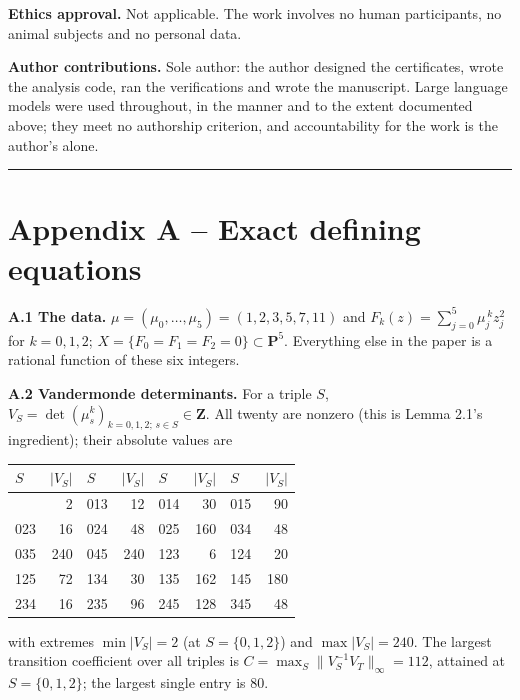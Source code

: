 \textbf{Ethics approval.} Not applicable. The work involves no human participants, no animal subjects and no personal data.

\textbf{Author contributions.} Sole author: the author designed the certificates, wrote the analysis code, ran the verifications and wrote the manuscript. Large language models were used throughout, in the manner and to the extent documented above; they meet no authorship criterion, and accountability for the work is the author's alone.

\begin{center}\rule{\linewidth}{0.5pt}\end{center}



\section{Appendix A -- Exact defining equations}\label{appendix-a-exact-defining-equations}

\textbf{A.1 The data.} \(\mu = (\mu_0, \dots, \mu_5) = (1, 2, 3, 5, 7, 11)\) and \(F_k(z) = \sum_{j=0}^{5} \mu_j^{\,k} z_j^2\) for \(k = 0, 1, 2\); \(X = \{F_0 = F_1 = F_2 = 0\} \subset \mathbf{P}^5\). Everything else in the paper is a rational function of these six integers.

\textbf{A.2 Vandermonde determinants.} For a triple \(S\), \(V_S = \det(\mu_s^k)_{k=0,1,2;\, s \in S} \in \mathbf{Z}\). All twenty are nonzero (this is Lemma 2.1's ingredient); their absolute values are

\begin{longtable}[]{@{}lrlrlrlr@{}}
\toprule\noalign{}
\(S\) & \(|V_S|\) & \(S\) & \(|V_S|\) & \(S\) & \(|V_S|\) & \(S\) & \(|V_S|\) \\
\midrule\noalign{}
\endhead
\bottomrule\noalign{}
\endlastfoot
012 & 2 & 013 & 12 & 014 & 30 & 015 & 90 \\
023 & 16 & 024 & 48 & 025 & 160 & 034 & 48 \\
035 & 240 & 045 & 240 & 123 & 6 & 124 & 20 \\
125 & 72 & 134 & 30 & 135 & 162 & 145 & 180 \\
234 & 16 & 235 & 96 & 245 & 128 & 345 & 48 \\
\end{longtable}

with extremes \(\min |V_S| = 2\) (at \(S = \{0,1,2\}\)) and \(\max |V_S| = 240\). The largest transition coefficient over all triples is \(C = \max_S \lVert V_S^{-1} V_T \rVert_\infty = 112\), attained at \(S = \{0,1,2\}\); the largest single entry is \(80\).

